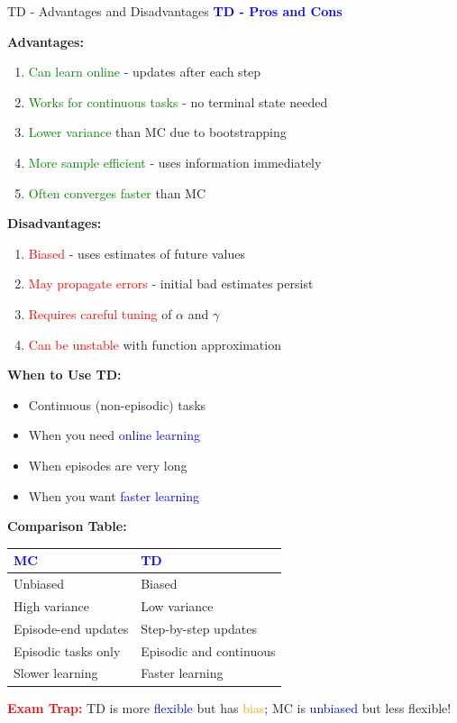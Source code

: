 \documentclass[8pt]{beamer}
\begin{document}
	\begin{frame}{TD - Advantages and Disadvantages}
		\fontsize{6.5}{7.5}\selectfont
		\textcolor{blue}{\textbf{TD - Pros and Cons}}
		
		\textbf{Advantages:}
		\begin{enumerate}
			\item \textcolor{green}{Can learn online} - updates after each step
			\item \textcolor{green}{Works for continuous tasks} - no terminal state needed
			\item \textcolor{green}{Lower variance} than MC due to bootstrapping
			\item \textcolor{green}{More sample efficient} - uses information immediately
			\item \textcolor{green}{Often converges faster} than MC
		\end{enumerate}
		
		\textbf{Disadvantages:}
		\begin{enumerate}
			\item \textcolor{red}{Biased} - uses estimates of future values
			\item \textcolor{red}{May propagate errors} - initial bad estimates persist
			\item \textcolor{red}{Requires careful tuning} of $\alpha$ and $\gamma$
			\item \textcolor{red}{Can be unstable} with function approximation
		\end{enumerate}
		
		\textbf{When to Use TD:}
		\begin{itemize}
			\item Continuous (non-episodic) tasks
			\item When you need \textcolor{blue}{online learning}
			\item When episodes are very long
			\item When you want \textcolor{blue}{faster learning}
		\end{itemize}
		
		\textbf{Comparison Table:}
		
		\begin{tabular}{|p{4cm}|p{4cm}|}
			\hline
			\textcolor{blue}{MC} & \textcolor{blue}{TD} \\
			\hline
			Unbiased & Biased \\
			\hline
			High variance & Low variance \\
			\hline
			Episode-end updates & Step-by-step updates \\
			\hline
			Episodic tasks only & Episodic and continuous \\
			\hline
			Slower learning & Faster learning \\
			\hline
		\end{tabular}
		
		\textcolor{red}{\textbf{Exam Trap:}} TD is more \textcolor{blue}{flexible} but has \textcolor{orange}{bias}; MC is \textcolor{blue}{unbiased} but less flexible!
	\end{frame}
	
\end{document}
